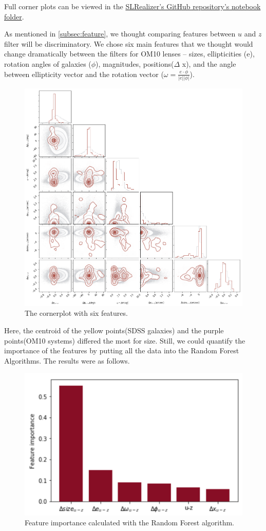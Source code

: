 \documentclass[\docopts]{\docclass}
\begin{document}
Full corner plots can be viewed in the
\href{https://github.com/jennykim1016/SLRealizer/blob/master/notebooks/SDSSvsOM10.ipynb}{SLRealizer's
GitHub repository's notebook folder}.

As mentioned in \autoref{subsec:feature}, we thought comparing features
between $u$ and $z$ filter will be discriminatory. We chose six main
features that we thought would change dramatically between the filters
for OM10 lenses -- sizes, ellipticities (e), rotation angles of galaxies
($\phi$), magnitudes, positions($\Delta$ x), and the angle between
ellipticity vector and the rotation vector ($\omega = \frac{e \cdot
\phi}{ \left | e \right | \left | \phi \right |}$).

\begin{figure}
\includegraphics[width=0.9\columnwidth]{cornerplot.png}
\caption{The cornerplot with six features.}
 \label{fig:cornerplot}
\end{figure}

Here, the centroid of the yellow points(SDSS galaxies) and the purple
points(OM10 systems) differed the most for size. Still, we could
quantify the importance of the features by putting all the data into the
Random Forest Algorithms. The results were as follows.

\begin{figure}[!h]
\includegraphics[width=0.4\columnwidth]{FeatureImportance.png}
\caption{Feature importance calculated with the Random Forest algorithm.}
 \label{fig:featureimportance}
\end{figure}
\end{document}
